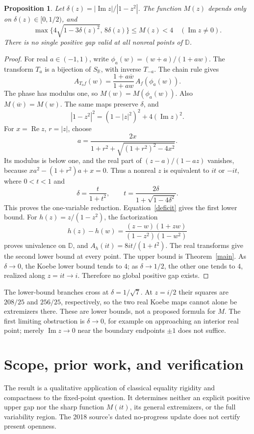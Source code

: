\documentclass[11pt]{article}
\newtheorem{proposition}[theorem]{Proposition}
\newcommand{\D}{\mathbb D}
\newcommand{\SR}{S_{\mathbb R}}
\newcommand{\cl}[1]{\overline{#1}}
\DeclareMathOperator{\Impart}{Im}
\begin{document}
\begin{proposition}\label{reduction}
Let $\delta(z)=|\Impart z|/|1-z^2|$. The function $M(z)$ depends only on
$\delta(z)\in[0,1/2)$, and
\begin{equation}\label{bounds}
 \max\{4\sqrt{1-3\delta(z)^2},\,8\delta(z)\}\le M(z)<4
 \quad(\Impart z\ne0).
\end{equation}
There is no single positive gap valid at all nonreal points of $\D$.
\end{proposition}
\begin{proof}
For real $a\in(-1,1)$, write $\phi_a(w)=(w+a)/(1+aw)$.
The transform $T_a$ is a bijection of $\SR$, with inverse $T_{-a}$.
The chain rule gives
\[
 A_{T_af}(w)=\frac{1+a\cl w}{1+aw}\,A_f(\phi_a(w)).
\]
The phase has modulus one, so $M(w)=M(\phi_a(w))$. Also
$M(\cl w)=M(w)$. The same maps preserve $\delta$, and
\[
 |1-z^2|^2=(1-|z|^2)^2+4(\Impart z)^2.
\]
For $x=\operatorname{Re}z$, $r=|z|$, choose
\[
 a=\frac{2x}{1+r^2+\sqrt{(1+r^2)^2-4x^2}}.
\]
Its modulus is below one, and the real part of $(z-a)/(1-az)$ vanishes,
because $xa^2-(1+r^2)a+x=0$. Thus a nonreal $z$ is equivalent to $it$ or
$-it$, where $0<t<1$ and
\[
 \delta=\frac{t}{1+t^2},\qquad
 t=\frac{2\delta}{1+\sqrt{1-4\delta^2}}.
\]
This proves the one-variable reduction. Equation~\eqref{deficit} gives the
first lower bound. For $h(z)=z/(1-z^2)$, the factorization
\[
 h(z)-h(w)=\frac{(z-w)(1+zw)}{(1-z^2)(1-w^2)}
\]
proves univalence on $\D$, and $A_h(it)=8it/(1+t^2)$. The real transforms
give the second lower bound at every point. The upper bound is
Theorem~\ref{main}. As $\delta\to0$, the Koebe lower bound tends to $4$;
as $\delta\to1/2$, the other one tends to $4$, realized along $z=it\to i$.
Therefore no global positive gap exists.
\end{proof}

The lower-bound branches cross at $\delta=1/\sqrt7$.
At $z=i/2$ their squares are $208/25$ and $256/25$, respectively, so the two
real Koebe maps cannot alone be extremizers there. These are lower bounds,
not a proposed formula for $M$. The first limiting obstruction is
$\delta\to0$, for example on approaching an interior real point; merely
$\Impart z\to0$ near the boundary endpoints $\pm1$ does not suffice.

\section{Scope, prior work, and verification}
The result is a qualitative application of classical equality rigidity and
compactness to the fixed-point question. It determines neither an explicit
positive upper gap nor the sharp function $M(it)$, its general extremizers,
or the full variability region. The 2018 source's dated no-progress update
does not certify present openness.
\end{document}
